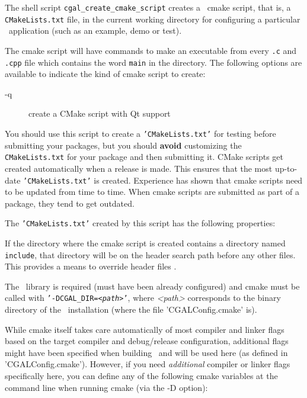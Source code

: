 The shell script
{{\tt cgal\_create\_cmake\_script}} creates a \cgal\ cmake script, that is, a {\tt CMakeLists.txt} file,
in the current working directory for configuring a particular \cgal\ application (such as an example, demo or test).

The cmake script will have commands to make an executable from every {\tt .c}
and {\tt .cpp} file which contains the word {\tt main} in the directory.
The following options are available to indicate the kind of cmake script
to create:
\begin{description}
\item[-q]   create a CMake script with Qt support
\end{description}


You should use this script to create a {\tt 'CMakeLists.txt'} for testing before submitting
your packages, but you should {\bf avoid} customizing the {\tt CMakeLists.txt} for your
package and then submitting it. 
CMake scripts get created automatically when a release is made. This ensures
that the most up-to-date {\tt 'CMakeLists.txt'} is created. Experience has shown
that cmake scripts need to be updated from time to time. 
When cmake scripts are submitted as part of a package, they tend to get outdated.


The {\tt 'CMakeLists.txt'} created by this script has the following properties:

If the directory where the cmake script is created contains a directory named {\tt include},%
that directory will be on the header search path before any other files. This
provides a means to override header files%
.

The \cgal\ library is required (must have been already configured) and
cmake must be called with {\tt '-DCGAL\_DIR={\em <path>}'},
where {\em <path>} corresponds to the binary directory of the \cgal\ installation
(where the file 'CGALConfig.cmake' is).

While cmake itself takes care automatically of most compiler and linker flags based
on the target compiler and debug/release configuration, additional flags
might have been specified when building \cgal\ and will be used here
(as defined in 'CGALConfig.cmake'). However, if you
need {\em additional} compiler or linker flags specifically here,
you can define any of the following cmake variables at the command line
when running cmake (via the -D option):

